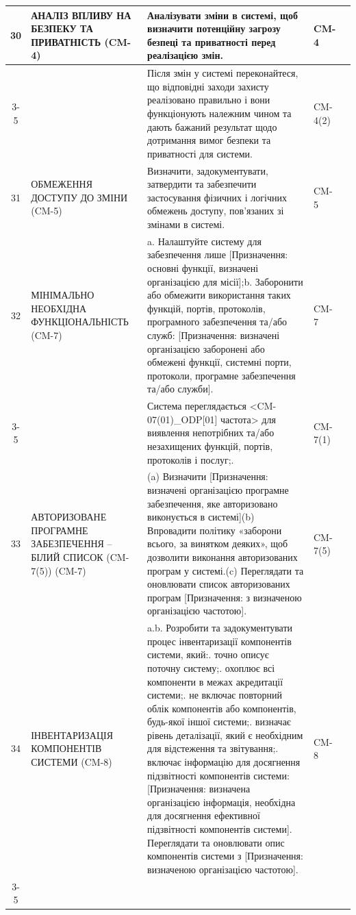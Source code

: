 \documentclass[10pt]{article}
\begin{document}
\begin{longtable}{|c|>{\raggedright\arraybackslash}p{4cm}|>{\raggedright\arraybackslash}p{6cm}|>{\raggedright\arraybackslash}p{1.5cm}|>{\raggedright\arraybackslash}p{3.5cm}|}
30 & АНАЛІЗ ВПЛИВУ НА БЕЗПЕКУ ТА ПРИВАТНІСТЬ (CM-4) & Аналізувати зміни в системі, щоб визначити потенційну загрозу безпеці та приватності перед реалізацією змін. & CM-4 & \\ \cline{3-5}
 &  & Після змін у системі переконайтеся, що відповідні заходи захисту реалізовано правильно і вони функціонують належним чином та дають бажаний результат щодо дотримання вимог безпеки та приватності для системи. & CM-4(2) & \\ \hline
31 & ОБМЕЖЕННЯ ДОСТУПУ ДО ЗМІНИ (CM-5) & Визначити, задокументувати, затвердити та забезпечити застосування фізичних і логічних обмежень доступу, пов'язаних зі змінами в системі. & CM-5 & \\ \hline
32 & МІНІМАЛЬНО НЕОБХІДНА ФУНКЦІОНАЛЬНІСТЬ (CM-7) & a. Налаштуйте систему для забезпечення лише [Призначення: основні функції, визначені організацією для місії];\newline b. Заборонити або обмежити використання таких функцій, портів, протоколів, програмного забезпечення та/або служб: [Призначення: визначені організацією заборонені або обмежені функції, системні порти, протоколи, програмне забезпечення та/або служби]. & CM-7 & \\ \cline{3-5}
 &  & Система переглядається <CM-07(01)\_\allowbreak{}ODP[01] частота> для виявлення непотрібних та/або незахищених функцій, портів, протоколів і послуг;.\newline  & CM-7(1) & \\ \hline
33 & АВТОРИЗОВАНЕ ПРОГРАМНЕ ЗАБЕЗПЕЧЕННЯ -- БІЛИЙ СПИСОК (CM-7(5)) (CM-7) & (a) Визначити [Призначення: визначені організацією програмне забезпечення, яке авторизовано виконується в системі]\newline (b) Впровадити політику «заборони всього, за винятком деяких», щоб дозволити виконання авторизованих програм у системі.\newline (c) Переглядати та оновлювати список авторизованих програм [Призначення: з визначеною організацією частотою]. & CM-7(5) & \\ \hline
34 & ІНВЕНТАРИЗАЦІЯ КОМПОНЕНТІВ СИСТЕМИ (CM-8) & a.\newline b. Розробити та задокументувати процес інвентаризації компонентів системи, який:\newline 1. точно описує поточну систему;\newline 2. охоплює всі компоненти в межах акредитації системи;\newline 3. не включає повторний облік компонентів або компонентів, будь-якої іншої системи;\newline 4. визначає рівень деталізації, який є необхідним для відстеження та звітування;\newline 5. включає інформацію для досягнення підзвітності компонентів системи: [Призначення: визначена організацією інформація, необхідна для досягнення ефективної підзвітності компонентів системи]. Переглядати та оновлювати опис компонентів системи з [Призначення: визначеною організацією частотою]. & CM-8 & \\ \cline{3-5}

\end{longtable}
\end{document}

